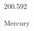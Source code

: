 \documentclass[12pt]{article}
\begin{document}
\hfill{}
\vfill
\begin{center}
  {\fontsize{50}{60}
  }

  200.592

Mercury
\end{center}
\vfill
\end{document}
